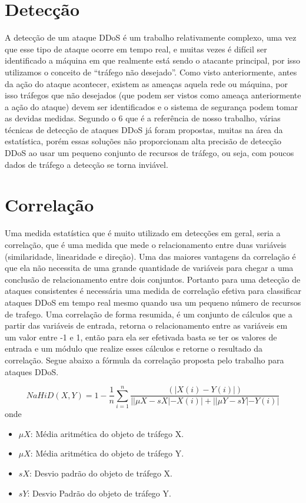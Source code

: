 \section{Detecção}
A detecção de um ataque DDoS é um trabalho relativamente complexo, uma vez que esse tipo de ataque ocorre em tempo real, e muitas vezes é difícil ser identificado a máquina em que realmente está sendo o atacante principal, por isso utilizamos o conceito de “tráfego não desejado”. Como visto anteriormente, antes da ação do ataque acontecer, existem as ameaças aquela rede ou máquina, por isso tráfegos que não desejados (que podem ser vistos como ameaça anteriormente a ação do ataque) devem ser identificados e o sistema de segurança podem tomar as devidas medidas. Segundo o {6} que é a referência de nosso trabalho, várias técnicas de detecção de ataques DDoS já foram propostas, muitas na área da estatística, porém essas soluções não proporcionam alta precisão de detecção DDoS ao usar um pequeno conjunto de recursos de tráfego, ou seja, com poucos dados de tráfego a detecção se torna inviável.

\section{Correlação}

Uma medida estatística que é muito utilizado em detecções em geral, seria a correlação, que é uma medida que mede o relacionamento entre duas variáveis (similaridade, linearidade e direção).  Uma das maiores vantagens da correlação é que ela não necessita de uma grande quantidade de variáveis para chegar a uma conclusão de relacionamento entre dois conjuntos. Portanto para uma detecção de ataques consistentes é necessária uma medida de correlação efetiva para classificar ataques DDoS  em tempo real mesmo quando usa um pequeno número de recursos de trafego. Uma correlação de forma resumida, é um conjunto de cálculos que a partir das variáveis de entrada, retorna o relacionamento entre as variáveis em um valor entre -1 e 1, então para ela ser efetivada basta se ter os valores de entrada e um módulo que realize esses cálculos e retorne o resultado da correlação. Segue abaixo a fórmula da correlação proposta pelo trabalho para ataques DDoS.

 \begin{equation}
 NaHiD(X,Y) = 1 - \frac{1}{n} \sum_{i=1}^{n} \frac{\left(|X(i) -	 Y(i)|\right)}{||\mu{X} - sX| - X(i)| + ||\mu{Y} - sY| - Y(i)|}
 \end{equation}
 onde
 \begin{itemize}
 	\item $\mu{X}$: Média aritmética do objeto de tráfego X.
 	\item $\mu{X}$: Média aritmética do objeto de tráfego Y.
 	\item $sX$: Desvio padrão do objeto de tráfego X.
 	\item $sY$: Desvio Padrão do objeto de tráfego Y.
 \end{itemize}

